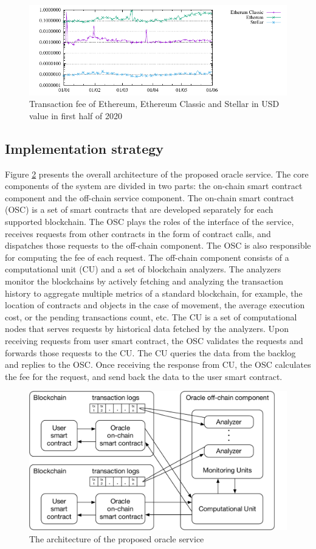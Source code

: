 \begin{figure}[ht!]
\begin{minipage}[b]{1\linewidth}
\centering
      \includegraphics[width=0.6\linewidth]{figures/transaction-fee-mean-usd}
\end{minipage}
\caption{Transaction fee of Ethereum, Ethereum Classic and Stellar in USD value in first half of 2020}
\label{fig:transaction-fee}
\end{figure}

\subsection{Implementation strategy}
\label{sec:strategy}
Figure \ref{fig:architecture} presents the overall architecture of the
proposed oracle service. The core components of the system are divided in two
parts: the on-chain smart contract component and the off-chain service
component. The on-chain smart contract (OSC) is a set of smart contracts that
are developed separately for each supported blockchain. The OSC plays the roles
of the interface of the service, receives requests from other contracts in the
form of contract calls, and dispatches those requests to the off-chain component.
The OSC is also responsible for computing the fee of each request. The off-chain
component consists of a computational unit (CU) and a set of blockchain
analyzers. The analyzers monitor the blockchains by actively fetching and
analyzing the transaction history to aggregate multiple metrics of a standard
blockchain, for example, the location of contracts and objects in the case of
movement, the average execution cost, or the pending transactions count, etc. The
CU is a set of computational nodes that serves requests by historical data
fetched by the analyzers. Upon receiving requests from user smart contract, the
OSC validates the requests and forwards those requests to the CU. The CU queries
the data from the backlog and replies to the OSC. Once receiving the response from CU,
the OSC calculates the fee for the request, and send back the data to the user
smart contract.

\begin{figure}[ht!]
\begin{minipage}[b]{1\linewidth}
\centering
      \includegraphics[width=0.6\linewidth]{figures/architecture}
\end{minipage}
\caption{The architecture of the proposed oracle service}
\label{fig:architecture}
\end{figure}

